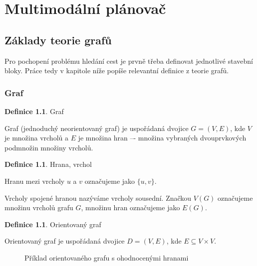 \documentclass[thesis=M,czech]{FITthesis}[2019/12/23]
\theoremstyle{plain}
\theoremstyle{definition}
\newtheorem{defn}[thm]{Definice} %
\begin{document}
\chapter{Multimodální plánovač}

\section{Základy teorie grafů}

Pro pochopení problému hledání cest je prvně třeba definovat jednotlivé stavební bloky. Práce tedy v kapitole níže popíše relevantní definice z teorie grafů.

\subsection{Graf}

\begin{defn}{Graf}\label{thm:graf}
	
Graf (jednoduchý neorientovaný graf) je uspořádaná dvojice $G = (V,E)$, kde $V$ je množina vrcholů a $E$ je množina hran –- množina vybraných dvouprvkových podmnožin množiny vrcholů. \cite{zaklady-teorie-grafu}

\end{defn}

\begin{defn}{Hrana, vrchol}\label{thm:graf}

Hranu mezi vrcholy $u$ a $v$ označujeme jako $\{u, v\}$. 

Vrcholy spojené hranou nazýváme vrcholy sousední. Značkou $V(G)$ označujeme množinu vrcholů grafu $G$, množinu hran označujeme jako $E(G)$. \cite{zaklady-teorie-grafu}

\end{defn}

\begin{defn}{Orientovaný graf}\label{thm:graf}

Orientovaný graf je uspořádaná dvojice $D = (V, E)$, kde $E \subseteq V \times V$. \cite{zaklady-teorie-grafu}

\end{defn}

\begin{figure}[H]\centering
	

	\caption[Příklad orientovaného grafu s ohodnocenými hranami]{Příklad orientovaného grafu s ohodnocenými hranami}\label{fig:float}
\end{figure}
\end{document}
